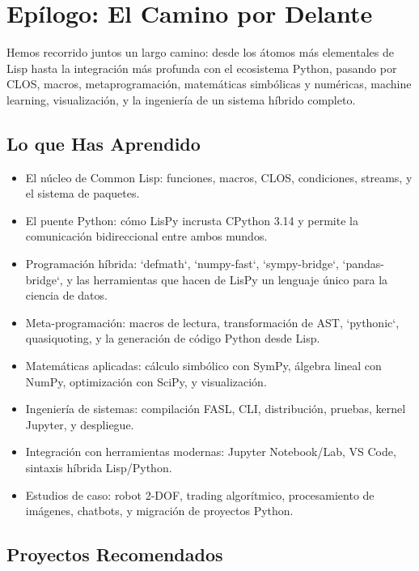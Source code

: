 \chapter{Epílogo: El Camino por Delante}
\label{chap:epilogue}

Hemos recorrido juntos un largo camino: desde los átomos más elementales de Lisp hasta la integración más profunda con el ecosistema Python, pasando por CLOS, macros, metaprogramación, matemáticas simbólicas y numéricas, machine learning, visualización, y la ingeniería de un sistema híbrido completo.

\section{Lo que Has Aprendido}

\begin{itemize}
\item El núcleo de Common Lisp: funciones, macros, CLOS, condiciones, streams, y el sistema de paquetes.

\item El puente Python: cómo LisPy incrusta CPython 3.14 y permite la comunicación bidireccional entre ambos mundos.

\item Programación híbrida: `defmath`, `numpy-fast`, `sympy-bridge`, `pandas-bridge`, y las herramientas que hacen de LisPy un lenguaje único para la ciencia de datos.

\item Meta-programación: macros de lectura, transformación de AST, `pythonic`, quasiquoting, y la generación de código Python desde Lisp.

\item Matemáticas aplicadas: cálculo simbólico con SymPy, álgebra lineal con NumPy, optimización con SciPy, y visualización.

\item Ingeniería de sistemas: compilación FASL, CLI, distribución, pruebas, kernel Jupyter, y despliegue.

\item Integración con herramientas modernas: Jupyter Notebook/Lab, VS Code, sintaxis híbrida Lisp/Python.

\item Estudios de caso: robot 2-DOF, trading algorítmico, procesamiento de imágenes, chatbots, y migración de proyectos Python.
\end{itemize}

\section{Proyectos Recomendados}

